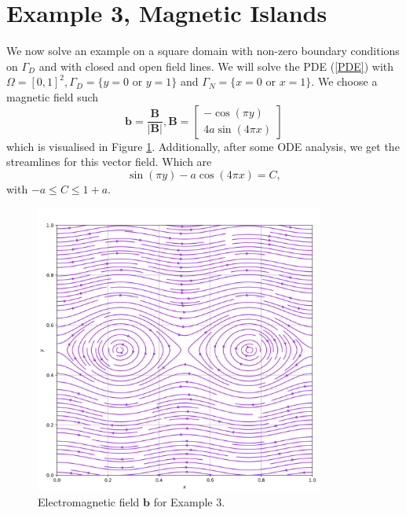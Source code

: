 \documentclass[12pt]{ociamthesis}
\begin{document}
\section{Example 3, Magnetic Islands}
We now solve an example on a square domain with non-zero boundary conditions on $\Gamma_D$ and with closed and open field lines. We will solve the PDE (\ref{PDE}) with $\Omega = [0,1]^2, \Gamma_D = \{y=0 \text{ or } y=1\}$ and $\Gamma_N = \{x=0 \text{ or } x=1\}$. We choose a magnetic field such 
\begin{equation}
\mathbf{b} = \frac{\mathbf{B}}{|\mathbf{B}|}, 
\mathbf{B} = \left[ \begin{matrix}
-\cos(\pi y)\\
4a \sin(4 \pi x)
\end{matrix} \right]
\end{equation}
which is visualised in Figure \ref{E3_VF}. Additionally, after some ODE analysis, we get the streamlines for this vector field. Which are
\begin{equation}
\sin(\pi y)-a\cos(4\pi x) = C,
\end{equation}
with $-a\leq C \leq 1+a$.
\begin{figure}[H]
\begin{center}
 \includegraphics[width=0.85\textwidth]{Pics/VectorField/E3b.png}
  \caption{Electromagnetic field $\mathbf{b}$ for Example $3$.}
 \label{E3_VF}
\end{center}
\end{figure}
\end{document}
